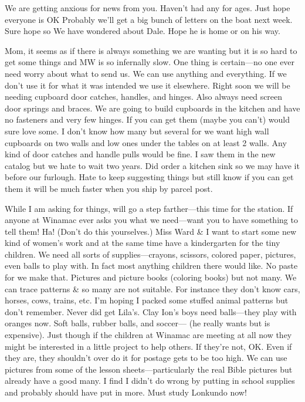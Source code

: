 \documentclass[
]{book}
\begin{document}
We are getting anxious for news from you. Haven't had any for ages. Just hope everyone is OK Probably we'll get a big bunch of letters on the boat next week. Sure hope so We have wondered about Dale. Hope he is home or on his way.

Mom, it seems as if there is always something we are wanting but it is so hard to get some things and MW is so infernally slow. One thing is certain---no one ever need worry about what to send us. We can use anything and everything. If we don't use it for what it was intended we use it elsewhere. Right soon we will be needing cupboard door catches, handles, and hinges. Also always need screen door springs and braces. We are going to build cupboards in the kitchen and have no fasteners and very few hinges. If you can get them (maybe you can't) would sure love some. I don't know how many but several for we want high wall cupboards on two walls and low ones under the tables on at least 2 walls. Any kind of door catches and handle pulls would be fine. I saw them in the new catalog but we hate to wait two years. Did order a kitchen sink so we may have it before our furlough. Hate to keep suggesting things but still know if you can get them it will be much faster when you ship by parcel post.

While I am asking for things, will go a step farther---this time for the station. If anyone at Winamac ever asks you what we need---want you to have something to tell them! Ha! (Don't do this yourselves.) Miss Ward \& I want to start some new kind of women's work and at the same time have a kindergarten for the tiny children. We need all sorts of supplies---crayons, scissors, colored paper, pictures, even balls to play with. In fact most anything children there would like. No paste for we make that. Pictures and picture books (coloring books) but not many. We can trace patterns \& so many are not suitable. For instance they don't know cars, horses, cows, trains, etc. I'm hoping I packed some stuffed animal patterns but don't remember. Never did get Lila's. Clay Ion's boys need balls---they play with oranges now. Soft balls, rubber balls, and soccer--- (he really wants but is expensive). Just though if the children at Winamac are meeting at all now they might be interested in a little project to help others. If they're not, OK. Even if they are, they shouldn't over do it for postage gets to be too high. We can use pictures from some of the lesson sheets---particularly the real Bible pictures but already have a good many. I find I didn't do wrong by putting in school supplies and probably should have put in more. Must study Lonkundo now!
\end{document}

